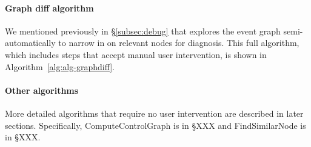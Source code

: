 

\paragraph{Graph diff algorithm}
We mentioned previously in \S\ref{subsec:debug} that \xxx explores the event
graph semi-automatically to narrow in on relevant nodes for diagnosis. This
full algorithm, which includes steps that accept manual user intervention, is
shown in Algorithm~\ref{alg:alg-graphdiff}.

\paragraph{Other algorithms}
More detailed algorithms that require no user intervention are described in later sections.
Specifically, ComputeControlGraph is in \S XXX and FindSimilarNode is in \S XXX.

%	

